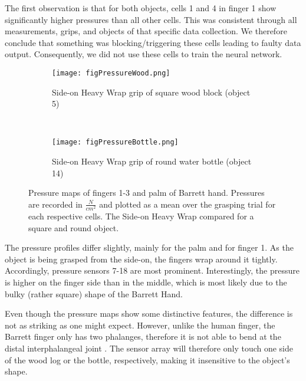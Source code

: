 The first observation is that for both objects, cells 1 and 4 in finger 1 show significantly higher pressures than all other cells. This was consistent through all measurements, grips, and objects of that specific data collection. We therefore conclude that something was blocking/triggering these cells leading to faulty data output. Consequently, we did not use these cells to train the neural network. 
\begin{figure*}%
        \begin{subfigure}{\textwidth}
        \hspace{-2cm}
                \texttt{[image: figPressureWood.png]}
                \vspace{-0.8cm}
                \caption{Side-on Heavy Wrap grip of square wood block (object 5)}
        \end{subfigure}\\[1cm]
        \begin{subfigure}{\textwidth}
        \hspace{-2cm}
                \texttt{[image: figPressureBottle.png]}
                \vspace{-0.8cm}
                \caption{Side-on Heavy Wrap grip of round water bottle (object 14)}
        \end{subfigure}
        \caption{Pressure maps of fingers 1-3 and palm of Barrett hand. Pressures are recorded in $\frac{N}{cm^2}$ and plotted as a mean over the grasping trial for each respective cells. The Side-on Heavy Wrap compared for a square and round object.}
        \label{WoodvsBottle}
\end{figure*}
\cleardoublepage
The pressure profiles differ slightly, mainly for the palm and for finger 1. As the object is being grasped from the side-on, the fingers wrap 
around it tightly. Accordingly, pressure sensors 7-18 are most prominent. Interestingly, the pressure is higher on the finger side than in the middle, which is most likely due to the bulky (rather square) shape of the Barrett Hand.

Even though the pressure maps show some distinctive features, the difference is not as striking as one might expect. However, unlike the human finger, the Barrett finger only has two phalanges, therefore it is not able to bend at the distal interphalangeal joint \cite{TortaGerardJ.2011}. The sensor array will therefore only touch one side of the wood log or the bottle, respectively, making it insensitive to the object's shape. 

